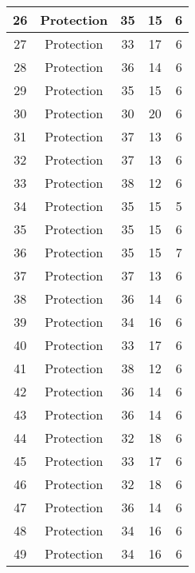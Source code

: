 \documentclass[results.tex]{subfiles}
\begin{document}
\begin{center}
\begin{tabular}{| c || c | c | c | c |}
    \hline
    26 & Protection & 35 & 15 & 6 \\ 
    \hline
    27 & Protection & 33 & 17 & 6 \\ 
    \hline
    28 & Protection & 36 & 14 & 6 \\ 
    \hline
    29 & Protection & 35 & 15 & 6 \\ 
    \hline
    30 & Protection & 30 & 20 & 6 \\ 
    \hline
    31 & Protection & 37 & 13 & 6 \\ 
    \hline
    32 & Protection & 37 & 13 & 6 \\ 
    \hline
    33 & Protection & 38 & 12 & 6 \\ 
    \hline
    34 & Protection & 35 & 15 & 5 \\ 
    \hline
    35 & Protection & 35 & 15 & 6 \\ 
    \hline
    36 & Protection & 35 & 15 & 7 \\ 
    \hline
    37 & Protection & 37 & 13 & 6 \\ 
    \hline
    38 & Protection & 36 & 14 & 6 \\ 
    \hline
    39 & Protection & 34 & 16 & 6 \\ 
    \hline
    40 & Protection & 33 & 17 & 6 \\ 
    \hline
    41 & Protection & 38 & 12 & 6 \\ 
    \hline
    42 & Protection & 36 & 14 & 6 \\ 
    \hline
    43 & Protection & 36 & 14 & 6 \\ 
    \hline
    44 & Protection & 32 & 18 & 6 \\ 
    \hline
    45 & Protection & 33 & 17 & 6 \\ 
    \hline
    46 & Protection & 32 & 18 & 6 \\ 
    \hline
    47 & Protection & 36 & 14 & 6 \\ 
    \hline
    48 & Protection & 34 & 16 & 6 \\ 
    \hline
    49 & Protection & 34 & 16 & 6 \\ 
    \hline   \end{tabular}
\end{center}
\end{document}
